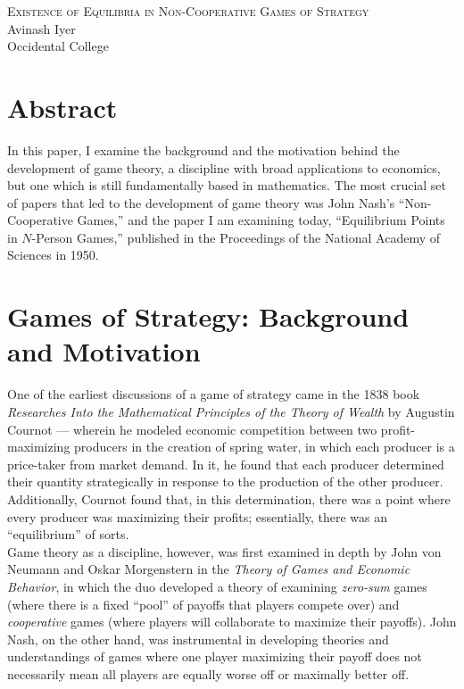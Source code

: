 \documentclass[12pt]{extarticle}
\title{}
\author{}
\date{}
\begin{document}
\doublespacing
  \begin{center}
    {\large \scshape Existence of Equilibria in Non-Cooperative Games of Strategy}\\
    Avinash Iyer\\
    Occidental College
  \end{center}
  \section*{Abstract}%
  In this paper, I examine the background and the motivation behind the development of game theory, a discipline with broad applications to economics, but one which is still fundamentally based in mathematics. The most crucial set of papers that led to the development of game theory was John Nash's ``Non-Cooperative Games,'' and the paper I am examining today, ``Equilibrium Points in $N$-Person Games,'' published in the Proceedings of the National Academy of Sciences in 1950.

  \section*{Games of Strategy: Background and Motivation}%
 One of the earliest discussions of a game of strategy came in the 1838 book \textit{Researches Into the Mathematical Principles of the Theory of Wealth} by Augustin Cournot --- wherein he modeled economic competition between two profit-maximizing producers in the creation of spring water, in which each producer is a price-taker from market demand. In it, he found that each producer determined their quantity strategically in response to the production of the other producer. Additionally, Cournot found that, in this determination, there was a point where every producer was maximizing their profits; essentially, there was an ``equilibrium'' of sorts.\\

  Game theory as a discipline, however, was first examined in depth by John von Neumann and Oskar Morgenstern in the \textit{Theory of Games and Economic Behavior}, in which the duo developed a theory of examining \textit{zero-sum} games (where there is a fixed ``pool'' of payoffs that players compete over) and \textit{cooperative} games (where players will collaborate to maximize their payoffs). John Nash, on the other hand, was instrumental in developing theories and understandings of games where one player maximizing their payoff does not necessarily mean all players are equally worse off or maximally better off.\\
\end{document}
